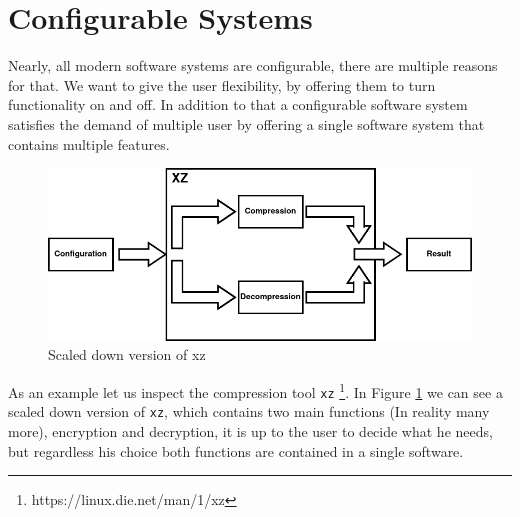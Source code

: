 \section{Configurable Systems}

Nearly, all modern software systems are configurable, there are multiple reasons for that. 
We want to give the user flexibility, by offering them to turn functionality on and off. 
In addition to that a configurable software system satisfies the demand of multiple user by offering a single software system that contains multiple features. 
\cite{TooManyKnobs}

\begin{figure}[h]
    \centering
    \includegraphics[scale=0.6]{gfx/ConfigurableSystemXZ.png}
    \caption{Scaled down version of xz}
    \label{fig:xz}
\end{figure}

As an example let us inspect the compression tool \texttt{xz} \footnote{https://linux.die.net/man/1/xz}. In Figure   \ref{fig:xz}
we can see a scaled down version of \texttt{xz}, which contains two main functions (In reality many more), encryption and decryption, it is up to the user to 
decide what he needs, but regardless his choice both functions are contained in a single software.
